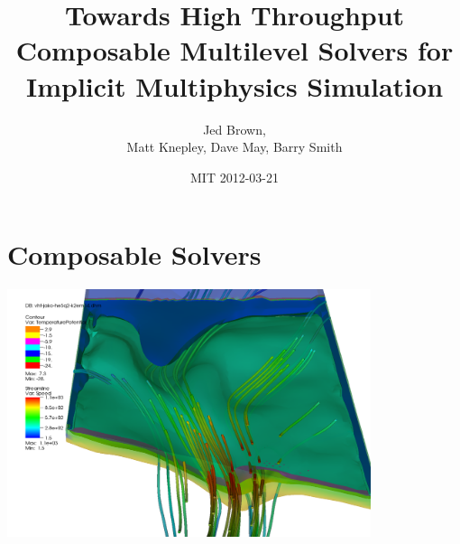 \documentclass{beamer}
\title{Towards High Throughput Composable Multilevel Solvers for Implicit Multiphysics Simulation}
\author{Jed Brown\inst{1},\\
Matt Knepley\inst{2}, Dave May\inst{3}, Barry Smith\inst{1}}
\institute
{
  \inst{1}{Mathematics and Computer Science Division, Argonne National Laboratory} \\
  \inst{2}{Computation Institute, University of Chicago} \\
  \inst{3}{ETH Z\"urich}
}
\date{MIT 2012-03-21}
\begin{document}
\lstset{language=C}
\normalem

\begin{frame}
  \titlepage
\end{frame}



\section{Composable Solvers}

















\begin{frame}
  \includegraphics[width=0.8\textwidth]{figures/VHT/VHTJakoContourStream}
\end{frame}



%


\end{document}
